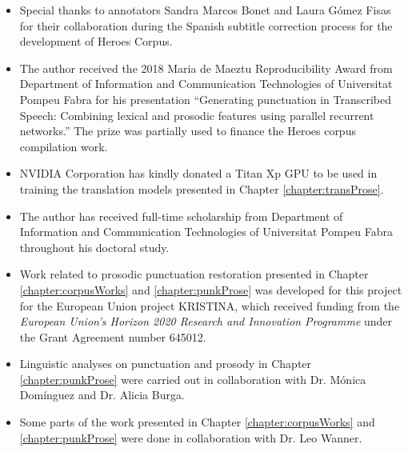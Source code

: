 \begin{itemize}
    \item Special thanks to annotators Sandra Marcos Bonet and Laura G\'omez Fisas for their collaboration during the Spanish subtitle correction process for the development of Heroes Corpus. 
    \item The author received the 2018 Maria de Maeztu Reproducibility Award from Department of Information and Communication Technologies of Universitat Pompeu Fabra for his presentation ``Generating punctuation in Transcribed Speech: Combining lexical and prosodic features using parallel recurrent networks.'' The prize was partially used to finance the Heroes corpus compilation work. 
    \item NVIDIA Corporation has kindly donated a Titan Xp GPU to be used in training the translation models presented in Chapter \ref{chapter:transProse}.
    \item The author has received full-time scholarship from Department of Information and Communication Technologies of Universitat Pompeu Fabra throughout his doctoral study. 
    \item Work related to prosodic punctuation restoration presented in Chapter \ref{chapter:corpusWorks} and \ref{chapter:punkProse} was developed for this project for the European Union project KRISTINA, which received funding from the \textit{European Union's Horizon 2020 Research and Innovation Programme} under the Grant Agreement number 645012.
    \item Linguistic analyses on punctuation and prosody in Chapter \ref{chapter:punkProse} were carried out in collaboration with Dr. Mónica Domínguez and Dr. Alicia Burga.  
    \item Some parts of the work presented in Chapter \ref{chapter:corpusWorks} and \ref{chapter:punkProse} were done in collaboration with Dr. Leo Wanner. 
\end{itemize}
